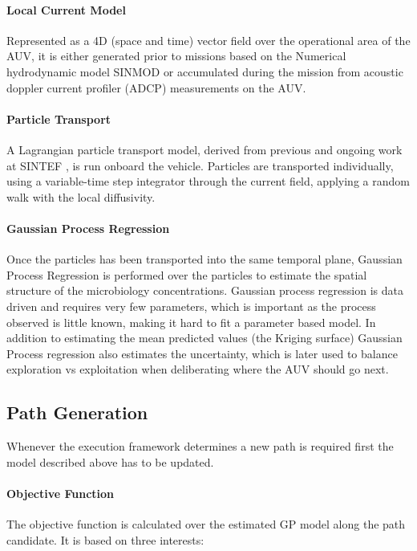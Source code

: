\documentclass[conference]{IEEEtran}
\newcommand{\cmt}[1]{{\color{red}{#1}}}
\begin{document}
\paragraph{Local Current Model}
Represented as a 4D (space and time) vector field over the operational area of the AUV, it is either generated prior to missions based on the Numerical hydrodynamic model SINMOD \cite{slagstad2005} or accumulated during the mission from acoustic doppler current
profiler (ADCP) measurements on the AUV.

\paragraph{Particle Transport}
A Lagrangian particle transport model, derived from previous and ongoing
work at SINTEF \cite{Rye2006}, is run onboard the vehicle.
Particles are transported individually, using a variable-time step
integrator \cite{Dormand1980} through the current field, applying a random walk with the local diffusivity.

\paragraph{Gaussian Process Regression} 
Once the particles has been transported into the same temporal plane, Gaussian Process Regression is performed over the particles to estimate the spatial structure of the microbiology concentrations.
Gaussian process regression is data driven and requires very few parameters, which is important as the process observed is little known, making it hard to fit a parameter based model.
In addition to estimating the mean predicted values (the Kriging surface)
Gaussian Process regression also estimates the uncertainty, which is
later used to balance exploration vs exploitation when deliberating
where the AUV should go next.

\subsection{Path Generation}
Whenever the execution framework determines a new path is required first the model described above has to be updated.
\paragraph{Objective Function}
The objective function is calculated over the estimated GP model along
the path candidate.  It is based on three interests:
\end{document}
